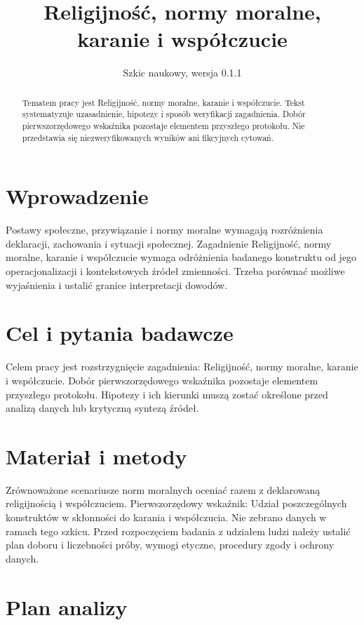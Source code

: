 \documentclass[11pt,a4paper]{article}
\title{Religijność, normy moralne, karanie i współczucie}
\author{}
\date{Szkic naukowy, wersja 0.1.1}
\begin{document}
\maketitle

\begin{abstract}

Tematem pracy jest Religijność, normy moralne, karanie i współczucie. Tekst systematyzuje uzasadnienie, hipotezy i sposób weryfikacji zagadnienia. Dobór pierwszorzędowego wskaźnika pozostaje elementem przyszłego protokołu. Nie przedstawia się niezweryfikowanych wyników ani fikcyjnych cytowań.

\end{abstract}

\section{Wprowadzenie}

Postawy społeczne, przywiązanie i normy moralne wymagają rozróżnienia deklaracji, zachowania i sytuacji społecznej. Zagadnienie Religijność, normy moralne, karanie i współczucie wymaga odróżnienia badanego konstruktu od jego operacjonalizacji i kontekstowych źródeł zmienności. Trzeba porównać możliwe wyjaśnienia i ustalić granice interpretacji dowodów.

\section{Cel i pytania badawcze}

Celem pracy jest rozstrzygnięcie zagadnienia: Religijność, normy moralne, karanie i współczucie. Dobór pierwszorzędowego wskaźnika pozostaje elementem przyszłego protokołu. Hipotezy i ich kierunki muszą zostać określone przed analizą danych lub krytyczną syntezą źródeł.

\section{Materiał i metody}

Zrównoważone scenariusze norm moralnych oceniać razem z deklarowaną religijnością i współczuciem. Pierwszorzędowy wskaźnik: Udział poszczególnych konstruktów w skłonności do karania i współczucia. Nie zebrano danych w ramach tego szkicu. Przed rozpoczęciem badania z udziałem ludzi należy ustalić plan doboru i liczebności próby, wymogi etyczne, procedury zgody i ochrony danych.

\section{Plan analizy}
\end{document}
